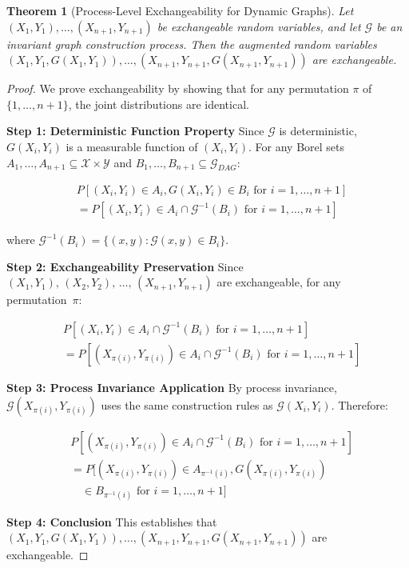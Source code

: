 \documentclass{uai2026} %
\theoremstyle{remark}
\theoremstyle{plain}
\newtheorem{theorem}{Theorem} %
\theoremstyle{definition}
\begin{document}
\begin{theorem}[Process-Level Exchangeability for Dynamic Graphs]
\label{thm:process-exchangeability-full}
Let $(X_1,Y_1),\ldots,(X_{n+1},Y_{n+1})$ be exchangeable random variables, 
and let $\mathcal{G}$ be an invariant graph construction process. 
Then the augmented random variables 
$(X_1,Y_1,G(X_1,Y_1)),\allowbreak \ldots,\allowbreak 
(X_{n+1},Y_{n+1},\allowbreak G(X_{n+1},Y_{n+1}))$
are exchangeable.

\end{theorem}

\begin{proof}
We prove exchangeability by showing that for any permutation $\pi$ of $\{1,\ldots,n+1\}$, the joint distributions are identical.

\textbf{Step 1: Deterministic Function Property}
Since $\mathcal{G}$ is deterministic, $G(X_i,Y_i)$ is a measurable function of $(X_i,Y_i)$. For any Borel sets $A_1,\ldots,A_{n+1} \subseteq \mathcal{X} \times \mathcal{Y}$ and $B_1,\ldots,B_{n+1} \subseteq \mathcal{G}_{DAG}$:

\begin{align}
&P[(X_i,Y_i) \in A_i, G(X_i,Y_i) \in B_i \text{ for } i=1,\ldots,n+1] \nonumber \\
&= P[(X_i,Y_i) \in A_i \cap \mathcal{G}^{-1}(B_i) \text{ for } i=1,\ldots,n+1]
\end{align}

where $\mathcal{G}^{-1}(B_i) = \{(x,y) : \mathcal{G}(x,y) \in B_i\}$.

\textbf{Step 2: Exchangeability Preservation}
Since \(
(X_1,Y_1),\allowbreak\,(X_2,Y_2),\allowbreak\,\ldots,\allowbreak\, 
(X_{n+1},Y_{n+1})
\) are exchangeable, for any permutation~\(\pi\):


\begin{align}
&P[(X_i,Y_i) \in A_i \cap \mathcal{G}^{-1}(B_i) \text{ for } i=1,\ldots,n+1] \nonumber \\
&= P[(X_{\pi(i)},Y_{\pi(i)}) \in A_i \cap \mathcal{G}^{-1}(B_i) \text{ for } i=1,\ldots,n+1]
\end{align}

\textbf{Step 3: Process Invariance Application}
By process invariance, $\mathcal{G}(X_{\pi(i)},Y_{\pi(i)})$ uses the same construction rules as $\mathcal{G}(X_i,Y_i)$. Therefore:

\begin{align}
&P[(X_{\pi(i)},Y_{\pi(i)}) \in A_i \cap \mathcal{G}^{-1}(B_i) \text{ for } i=1,\ldots,n+1] \nonumber \\
&= P[(X_{\pi(i)},Y_{\pi(i)}) \in A_{\pi^{-1}(i)}, G(X_{\pi(i)},Y_{\pi(i)}) \nonumber \\
&\quad \in B_{\pi^{-1}(i)} \text{ for } i=1,\ldots,n+1]
\end{align}

\textbf{Step 4: Conclusion}
This establishes that 
$(X_1,Y_1,G(X_1,Y_1)),\allowbreak \ldots,\allowbreak 
(X_{n+1},Y_{n+1},G(X_{n+1},Y_{n+1}))$
are exchangeable.

\end{proof}
\end{document}
